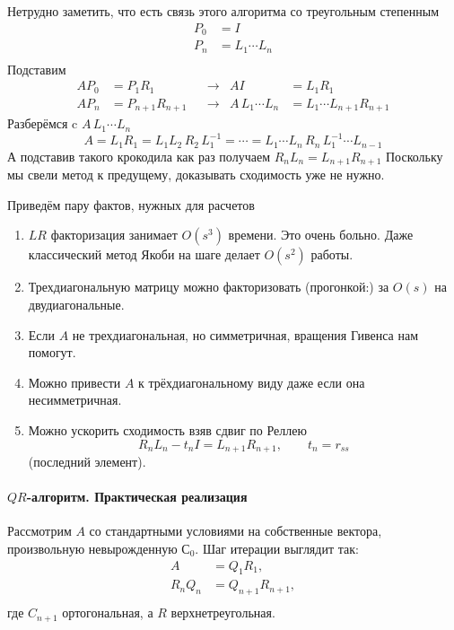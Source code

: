 \documentclass{trlnotes}
\begin{document}
Нетрудно заметить, что есть связь этого алгоритма со треугольным степенным
\[
  \begin{aligned}
    P_0 &= I \\
    P_n &= L_{1} \dotsm L_n \\
  \end{aligned}
\]
Подставим 
\[
  \begin{aligned}
    A P_0 &= P_1 R_1         & &\to& A I &= L_1 R_1 \\
    A P_n &= P_{n+1} R_{n+1} & &\to& A\, L_1 \dotsm L_n &= L_1 \dotsm L_{n+1} R_{n+1}
  \end{aligned}
\]
Разберёмся c $A\, L_1 \dotsm L_n$
\[
  A = L_1 R_1 = L_1 L_2 \, R_2 \, L_1^{-1} = \dotsb
  = L_1 \dotsm L_n \, R_n  \, L_1^{-1} \dotsm L_{n-1}
\]
А подставив такого крокодила как раз получаем $R_nL_n = L_{n+1}R_{n+1}$
Поскольку мы свели метод к предущему, доказывать сходимость уже не нужно.

Приведём пару фактов, нужных для расчетов
\begin{enumerate}
  \item $LR$ факторизация занимает $O(s^3)$ времени. Это очень больно.
    Даже классический метод Якоби на шаге делает $O(s^2)$ работы.
  \item Трехдиагональную матрицу можно факторизовать (прогонкой:) за
    $O(s)$ на двудиагональные.
  \item Если $A$ не трехдиагональная, но симметричная, вращения Гивенса нам помогут.
  \item Можно привести $A$ к трёхдиагональному виду даже если она несимметричная.
  \item Можно ускорить сходимость взяв сдвиг по Реллею
    \[
      R_n L_n - t_n I = L_{n+1} R_{n+1}, \qquad t_n = r_{ss}
    \]
    (последний элемент).
\end{enumerate}

\paragraph{$QR$-алгоритм. Практическая реализация}

\begin{defn}\label{defn:lin::iterspaceconv}
  Рассмотрим $A$ со стандартными условиями на собственные вектора, 
  произвольную невырожденную $С_0$.
  Шаг итерации выглядит так: 
  \[
    \begin{aligned}
      A &= Q_{1}R_{1}, \\
      R_n Q_n &= Q_{n+1}R_{n+1}, \\
    \end{aligned}
  \]где $C_{n+1}$ ортогональная, а $R$ верхнетреугольная.
\end{defn}
\end{document}
